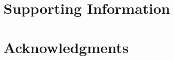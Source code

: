 \documentclass[10pt,letterpaper]{article}
\begin{document}
\section*{Supporting Information}


\section*{Acknowledgments}

\cite{Freeman:1987}
\nolinenumbers

%
%
% 





\end{document}
